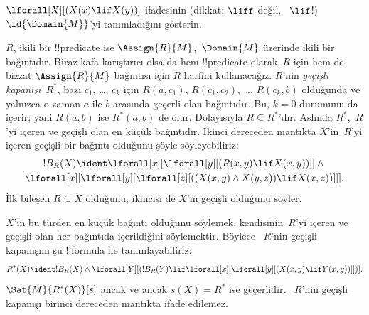\documentclass[../../../include/open-logic-section]{subfiles}
\begin{document}
\begin{prob}
$\lforall[X][(X(x) \lif X(y))]$ ifadesinin (dikkat: $\liff$ değil,
~$\lif$!) $\Id{\Domain{M}}$'yi tanımladığını gösterin.
\end{prob}

\begin{ex}
$R$, ikili bir !!{predicate} ise $\Assign{R}{M}$,~$\Domain{M}$ üzerinde
ikili bir bağıntıdır. Biraz kafa karıştırıcı olsa da hem !!{predicate}
olarak~$R$ için hem de bizzat $\Assign{R}{M}$ bağıntısı için $R$ harfini
kullanacağız. $R$'nin \emph{geçişli kapanışı}~$R^*$, bazı
$c_1$, \dots, $c_k$ için $R(a,c_1)$, $R(c_1,c_2)$, \dots, $R(c_k,b)$
olduğunda ve yalnızca o zaman $a$ ile $b$ arasında geçerli olan bağıntıdır.
Bu, $k=0$ durumunu da içerir; yani $R(a,b)$ ise $R^*(a,b)$ de olur.
Dolayısıyla $R \subseteq R^*$'dır. Aslında $R^*$,~$R$'yi içeren ve geçişli
olan en küçük bağıntıdır. İkinci dereceden mantıkta $X$'in~$R$'yi içeren
geçişli bir bağıntı olduğunu şöyle söyleyebiliriz:
\begin{multline*}
  !B_R(X) \ident \lforall[x][\lforall[y][(R(x,y) \lif X(x, y))]] \land {}\\
\lforall[x][\lforall[y][\lforall[z][((X(x,y) \land X(y,z)) \lif X(x,
      z))]]].
\end{multline*}
İlk bileşen $R \subseteq X$ olduğunu, ikincisi de $X$'in geçişli olduğunu
söyler.

$X$'in bu türden en küçük bağıntı olduğunu söylemek, kendisinin~$R$'yi
içeren ve geçişli olan her bağıntıda içerildiğini söylemektir. Böylece
~$R$'nin geçişli kapanışını şu !!{formula} ile tanımlayabiliriz:
\[
R^*(X) \ident !B_R(X) \land \lforall[Y][(!B_R(Y) \lif
  \lforall[x][\lforall[y][(X(x, y) \lif Y(x,y))]])].
\]
$\Sat{M}{R^*(X)}[s]$ ancak ve ancak $s(X)=R^*$ ise geçerlidir.
~$R$'nin geçişli kapanışı birinci dereceden mantıkta ifade edilemez.
\end{ex}
\end{document}
